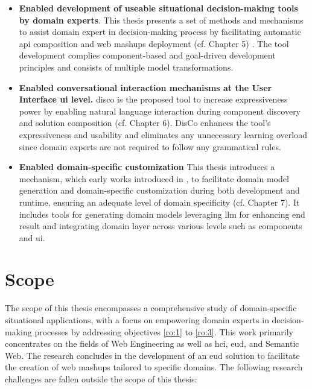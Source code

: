 \begin{itemize}
\tightlist
\item
  \textbf{Enabled development of useable situational decision-making
    tools by domain experts}. This thesis presents a set of methods and
    mechanisms to assist domain expert in decision-making process by
    facilitating automatic \gls{api} composition and web mashups deployment
    (cf. Chapter 5) . The tool development complies component-based and
    goal-driven development principles and consists of multiple model
    transformations.
    
\item
  \textbf{Enabled conversational interaction mechanisms at the User
  Interface \gls{ui} level.} \gls{disco} \autocite{Zarei2021} \autocite{Zarei2020} is the proposed tool to increase
  expressiveness power by enabling natural language interaction during
  component discovery and solution composition (cf. Chapter 6). DisCo
  enhances the tool's expressiveness and usability and eliminates any
  unnecessary learning overload since domain experts are not required to
  follow any grammatical rules.
  
\item
  \textbf{Enabled domain-specific customization} This thesis introduces
  a mechanism, which early works introduced in \autocite{Zarei2018} \autocite{Zarei2018a}, to facilitate domain model generation
  and domain-specific customization during both development and runtime,
  ensuring an adequate level of domain specificity (cf. Chapter 7). It
  includes tools for generating domain models leveraging \gls{llm} for
  enhancing end result and integrating domain layer across various
  levels such as components and \gls{ui}.
\end{itemize}


\vspace{-15pt}
\hypertarget{sec:scope}{%
\section{Scope}\label{sec:scope}}
\vspace{15pt}

The scope of this thesis encompasses a comprehensive study of domain-specific situational applications, with a focus on empowering domain experts in decision-making processes by addressing objectives \cref{ro:1} to \cref {ro:3}. This work primarily concentrates on the fields of Web Engineering as well as \gls{hci}, \gls{eud}, and Semantic Web. The research concludes in the development of an \gls{eud} solution to facilitate the creation of web mashups tailored to specific domains. The following research challenges are fallen outside the scope of this thesis:

